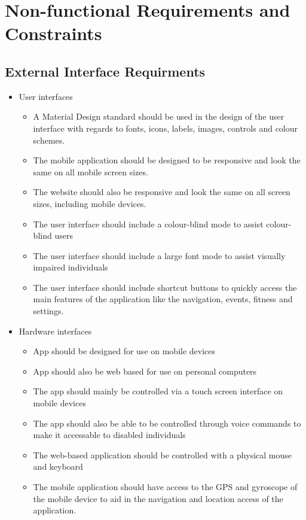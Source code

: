 \documentclass{article}
\begin{document}
		
		\clearpage
		
	\section{Non-functional Requirements and Constraints}\label{sec: non-functional-requirments}
	
		\subsection{External Interface Requirments}\label{sec:external-inteface-requirments}
		\begin{itemize}
			\item User interfaces
				\begin{itemize}
					\item A Material Design standard should be used in the design of the user interface with regards to fonts, icons, labels, images, controls and colour schemes.
					\item The mobile application should be designed to be responsive and look the same on all mobile screen sizes.
					\item The website should also be responsive and look the same on all screen sizes, including mobile devices.
					\item The user interface should include a colour-blind mode to assist colour-blind users
					\item The user interface should include a large font mode to assist visually impaired individuals
					\item The user interface should include shortcut buttons to quickly access the main features of the application like the navigation, events, fitness and settings.
				\end{itemize}
				
			\item Hardware interfaces
				\begin{itemize}
					\item App should be designed for use on mobile devices
					\item App should also be web based for use on personal computers
					\item The app should mainly be controlled via a touch screen interface on mobile devices
					\item The app should also be able to be controlled through voice commands to make it accessable to disabled individuals
					\item The web-based application should be controlled with a physical mouse and keyboard
					\item The mobile application should have access to the GPS and gyroscope of the mobile device to aid in the navigation and location access of the application.
				\end{itemize}


\end{itemize}
\end{document}
